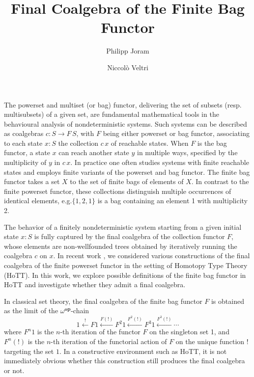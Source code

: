 \documentclass{easychair}
\begin{document}
  \title{Final Coalgebra of the Finite Bag Functor}
  \author{%
      Philipp Joram \and
      Niccol{\`o} Veltri
  }

  \maketitle

  The powerset and multiset (or bag) functor, delivering the set of
  subsets (resp. multisubsets) of a given set, are fundamental
  mathematical tools in the behavioural analysis of nondeterministic
  systems. Such systems can be described as coalgebras $c : S \to
  F\, S$, with $F$ being either powerset or bag functor, associating
  to each state $x : S$ the collection $c \, x$ of reachable
  states. When $F$ is the bag functor, a state $x$ can reach
  another state $y$ in multiple ways, specified by the multiplicity of
  $y$ in $c\,x$. In practice one often studies systems with finite reachable
  states and employs finite variants of the powerset and bag functor.
  The finite bag functor takes a set $X$ to the set of finite
  bags of elements of $X$.  In contrast to the finite powerset
  functor, these collections distinguish multiple occurrences of
  identical elements, e.g.\@ $\{1, 2, 1\}$ is a bag containing an element
  1 with multiplicity 2.
  
  The behavior of a finitely nondeterministic system starting from a
  given initial state $x : S$ is fully captured by the final coalgebra
  of the collection functor $F$, whose elements are non-wellfounded
  trees obtained by iteratively running the coalgebra $c$ on $x$. In
  recent work \cite{Veltri2021}, we considered various constructions
  of the final coalgebra of the finite powerset functor in the setting
  of Homotopy Type Theory (HoTT). In this work, we explore possible
  definitions of the finite bag functor in HoTT and investigate
  whether they admit a final coalgebra.

  In classical set theory, the final coalgebra of the finite bag
  functor $F$ is obtained as the limit of the
  $\omega^{\operatorname{\mathbf{op}}}$-chain
  \cite[{Ch. 3.3.13}]{Adamek2021}
  \begin{equation}\label{eq:chain}
    1 \xleftarrow{!} {F 1}
      \xleftarrow{F(!)} {F^2 1}
      \xleftarrow{F^2(!)} {F^3 1}
      \xleftarrow{F^3(!)}
      \cdots
  \end{equation}
  where $F^n 1$ is the $n$-th iteration of the functor $F$ on the
  singleton set 1, and $F^n(!)$ is the $n$-th iteration of the
  functorial action of $F$ on the unique function $!$ targeting the set
  $1$. In a constructive environment such as HoTT, it is not
  immediately obvious whether this construction still produces the
  final coalgebra or not.
\end{document}
